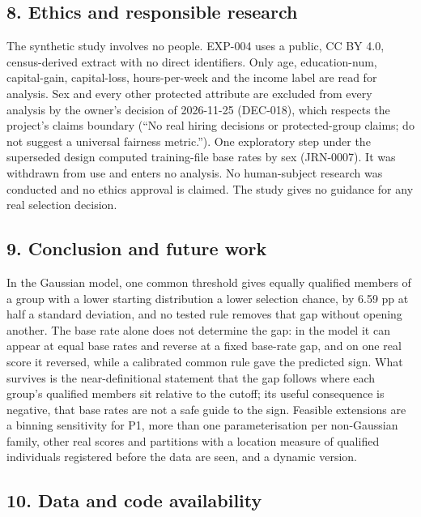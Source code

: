 \documentclass[
]{article}
\begin{document}
\subsection{8. Ethics and responsible
research}\label{ethics-and-responsible-research}

The synthetic study involves no people. EXP-004 uses a public, CC BY
4.0, census-derived extract with no direct identifiers. Only age,
education-num, capital-gain, capital-loss, hours-per-week and the income
label are read for analysis. Sex and every other protected attribute are
excluded from every analysis by the owner's decision of 2026-11-25
(DEC-018), which respects the project's claims boundary (``No real
hiring decisions or protected-group claims; do not suggest a universal
fairness metric.''). One exploratory step under the superseded design
computed training-file base rates by sex (JRN-0007). It was withdrawn
from use and enters no analysis. No human-subject research was conducted
and no ethics approval is claimed. The study gives no guidance for any
real selection decision.

\subsection{9. Conclusion and future
work}\label{conclusion-and-future-work}

In the Gaussian model, one common threshold gives equally qualified
members of a group with a lower starting distribution a lower selection
chance, by 6.59 pp at half a standard deviation, and no tested rule
removes that gap without opening another. The base rate alone does not
determine the gap: in the model it can appear at equal base rates and
reverse at a fixed base-rate gap, and on one real score it reversed,
while a calibrated common rule gave the predicted sign. What survives is
the near-definitional statement that the gap follows where each group's
qualified members sit relative to the cutoff; its useful consequence is
negative, that base rates are not a safe guide to the sign. Feasible
extensions are a binning sensitivity for P1, more than one
parameterisation per non-Gaussian family, other real scores and
partitions with a location measure of qualified individuals registered
before the data are seen, and a dynamic version.

\subsection{10. Data and code
availability}\label{data-and-code-availability}
\end{document}
